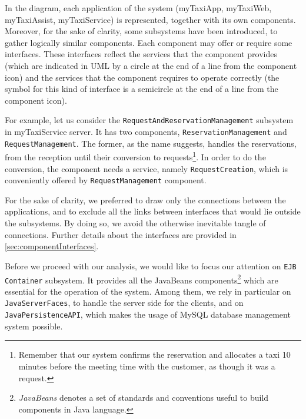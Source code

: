 In the diagram, each application of the system (myTaxiApp, myTaxiWeb, myTaxiAssist, myTaxiService) is represented, together with its own components. Moreover, for the sake of clarity, some subsystems have been introduced, to gather logically similar components. Each component may offer or require some interfaces. These interfaces reflect the services that the component provides (which are indicated in UML by a circle at the end of a line from the component icon) and the services that the component requires to operate correctly (the symbol for this kind of interface is a semicircle at the end of a line from the component icon).

For example, let us consider the \texttt{Re\-quest\-And\-Res\-er\-va\-tion\-Man\-age\-ment} subsystem in myTaxiService server. It has two components, \texttt{Res\-er\-va\-tion\-Man\-age\-ment} and \texttt{Re\-quest\-Man\-age\-ment}. The former, as the name suggests, handles the reservations, from the reception until their conversion to requests\footnote{Remember that our system confirms the reservation and allocates a taxi \num{10} minutes before the meeting time with the customer, as though it was a request.}. In order to do the conversion, the component needs a service, namely \texttt{Re\-quest\-Cre\-ation}, which is conveniently offered by \texttt{Re\-quest\-Man\-age\-ment} component.

For the sake of clarity, we preferred to draw only the connections between the applications, and to exclude all the links between interfaces that would lie outside the subsystems. By doing so, we avoid the otherwise inevitable tangle of connections. Further details about the interfaces are provided in \cref{sec:componentInterfaces}.

Before we proceed with our analysis, we would like to focus our attention on \texttt{EJB Con\-tain\-er} subsystem. It provides all the JavaBeans components\footnote{\emph{JavaBeans} denotes a set of standards and conventions useful to build components in Java language.} which are essential for the operation of the system. Among them, we rely in particular on \texttt{Java\-Ser\-ver\-Faces}, to handle the server side for the clients, and on \texttt{Java\-Per\-sist\-ence\-API}, which makes the usage of MySQL database management system possible.





